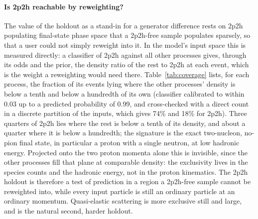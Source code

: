 \documentclass[11pt]{article}
\begin{document}
\paragraph{Is 2p2h reachable by reweighting?} The value of the holdout as a stand-in for a generator difference
rests on 2p2h populating final-state phase space that a 2p2h-free sample populates sparsely, so that a user could
not simply reweight into it. In the model's input space this is measured directly: a classifier of 2p2h against
all other processes gives, through its odds and the prior, the density ratio of the rest to 2p2h at each event,
which is the weight a reweighting would need there. Table~\ref{tab:coverage} lists, for each process, the
fraction of its events lying where the other processes' density is below a tenth and below a hundredth of its
own (classifier calibrated to within 0.03 up to a predicted probability of 0.99, and cross-checked with a direct
count in a discrete partition of the inputs, which gives 74\% and 18\% for 2p2h). Three quarters of 2p2h lies
where the rest is below a tenth of its density, and about a quarter where it is below a hundredth; the signature
is the exact two-nucleon, no-pion final state, in particular a proton with a single neutron, at low hadronic
energy. Projected onto the two proton momenta alone this is invisible, since the other processes fill that plane
at comparable density: the exclusivity lives in the species counts and the hadronic energy, not in the proton
kinematics. The 2p2h holdout is therefore a test of prediction in a region a 2p2h-free sample cannot be
reweighted into, while every input particle is still an ordinary particle at an ordinary momentum. Quasi-elastic
scattering is more exclusive still and large, and is the natural second, harder holdout.

\begin{table}[h]\centering\footnotesize

\caption{Per interaction type: share of CC $\nu_\mu$ events, classifier AUC against all other processes on the
model inputs, fraction of the process located where the other processes' density is below 0.1 and below 0.01 of
its own, and the median density ratio rest/process over the process's events.}
\label{tab:coverage}
\end{table}
\end{document}
